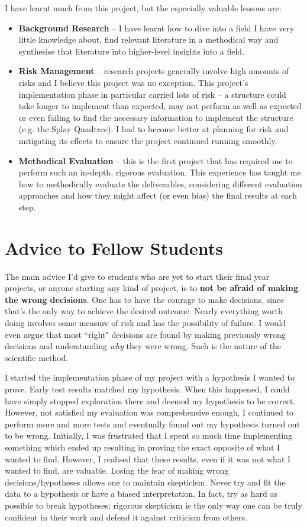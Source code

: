 I have learnt much from this project, but the especially valuable lessons are:
\begin{itemize}
	\item \textbf{Background Research} -- I have learnt how to dive into a field I have very little knowledge about, find relevant literature in a methodical way and synthesise that literature into higher-level insights into a field.
	\item \textbf{Risk Management} -- research projects generally involve high amounts of risks and I believe this project was no exception. This project's implementation phase in particular carried lots of risk -- a structure could take longer to implement than expected, may not perform as well as expected or even failing to find the necessary information to implement the structure (e.g. the Splay Quadtree). I had to become better at planning for risk and mitigating its effects to ensure the project continued running smoothly.
	\item \textbf{Methodical Evaluation} -- this is the first project that has required me to perform such an in-depth, rigorous evaluation. This experience has taught me how to methodically evaluate the deliverables, considering different evaluation approaches and how they might affect (or even bias) the final results at each step.
\end{itemize} 

\section{Advice to Fellow Students}

The main advice I'd give to students who are yet to start their final year projects, or anyone starting any kind of project, is to \textbf{not be afraid of making the wrong decisions}. One has to have the courage to make decisions, since that's the only way to achieve the desired outcome. Nearly everything worth doing involves some measure of risk and has the possibility of failure. I would even argue that most ``right" decisions are found by making previously wrong decisions and understanding \textit{why} they were wrong. Such is the nature of the scientific method.

I started the implementation phase of my project with a hypothesis I wanted to prove. Early test results matched my hypothesis. When this happened, I could have simply stopped exploration there and deemed my hypothesis to be correct. However, not satisfied my evaluation was comprehensive enough, I continued to perform more and more tests and eventually found out my hypothesis turned out to be wrong. Initially, I was frustrated that I spent so much time implementing something which ended up resulting in proving the exact opposite of what I wanted to find. However, I realised that these results, even if it was not what I wanted to find, are valuable. Losing the fear of making wrong decisions/hypotheses allows one to maintain skepticism. Never try and fit the data to a hypothesis or have a biased interpretation. In fact, try as hard as possible to break hypotheses; rigorous skepticism is the only way one can be truly confident in their work and defend it against criticism from others.


